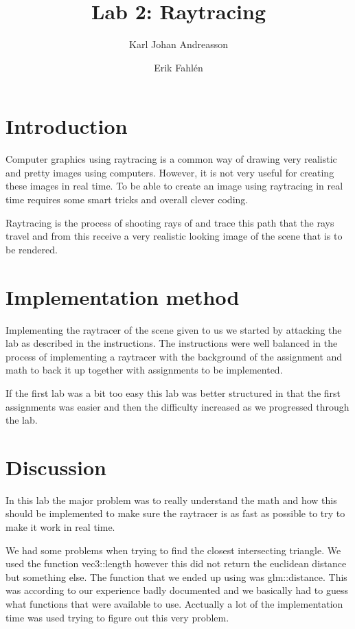 \documentclass[a4]{article}
\begin{document}
\title{Lab 2: Raytracing}

\author{Karl Johan Andreasson \and Erik Fahlén}

\maketitle

\section{Introduction}
Computer graphics using raytracing is a common way of drawing very realistic and
pretty images using computers. However, it is not very useful for creating these
images in real time. To be able to create an image using raytracing in real time
requires some smart tricks and overall clever coding.

Raytracing is the process of shooting rays of and trace this path that the rays
travel and from this receive a very realistic looking image of the scene that is
to be rendered.

\section{Implementation method}
Implementing the raytracer of the scene given to us we started by attacking the
lab as described in the instructions. The instructions were well balanced in the
process of implementing a raytracer with the background of the assignment and
math to back it up together with assignments to be implemented.

If the first lab was a bit too easy this lab was better structured in that the
first assignments was easier and then the difficulty increased as we progressed
through the lab.
\section{Discussion}
In this lab the major problem was to really understand the math and how this
should be implemented to make sure the raytracer is as fast as possible to try
to make it work in real time.

We had some problems when trying to find the closest intersecting triangle. We
used the function vec3::length however this did not return the euclidean
distance but something else. The function that we ended up using was
glm::distance. This was according to our experience badly documented and we
basically had to guess what functions that were available to use. Acctually a
lot of the implementation time was used trying to figure out this very problem.
\end{document}
